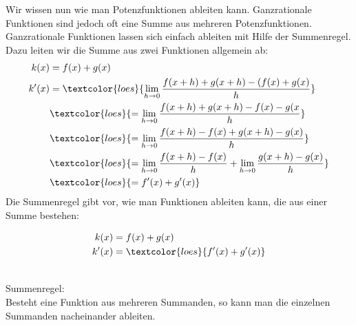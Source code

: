 Wir wissen nun wie man Potenzfunktionen ableiten kann. Ganzrationale Funktionen sind jedoch oft eine Summe aus mehreren Potenzfunktionen. Ganzrationale Funktionen lassen sich einfach ableiten mit Hilfe der Summenregel. Dazu leiten wir die Summe aus zwei Funktionen allgemein ab:\\
\begin{align*}
	k(x)&=f(x)+g(x)\\
	k'(x)&=\textcolor{loes}{\lim\limits_{h\to 0}\frac{f(x+h)+g(x+h)-(f(x)+g(x)}{h}}\\
	&\textcolor{loes}{=\lim\limits_{h\to 0}\frac{f(x+h)+g(x+h)-f(x)-g(x}{h}}\\
	&\textcolor{loes}{=\lim\limits_{h\to 0}\frac{f(x+h)-f(x)+g(x+h)-g(x)}{h}}\\
	&\textcolor{loes}{=\lim\limits_{h\to 0}\frac{f(x+h)-f(x)}{h}+\lim\limits_{h\to 0}\frac{g(x+h)-g(x)}{h}}\\
	&\textcolor{loes}{=f'(x)+g'(x)}\\
\end{align*}
Die Summenregel gibt vor, wie man Funktionen ableiten kann, die aus einer Summe bestehen:
\begin{minipage}[t]{\textwidth}
	\begin{minipage}{0.3\textwidth}
		\begin{align*}
			k(x)&=f(x)+g(x)\\
			k'(x)&=\textcolor{loes}{f'(x)+g'(x)}\\
		\end{align*}
	\end{minipage}
	\begin{minipage}{0.7\textwidth}
		\begin{tcolorbox}
			\phantom{text}\\
			\textcolor{loestc}{Summenregel:\\
				Besteht eine Funktion aus mehreren Summanden, so kann man die einzelnen Summanden nacheinander ableiten.}\\
		\end{tcolorbox}
	\end{minipage}
\end{minipage}\\
